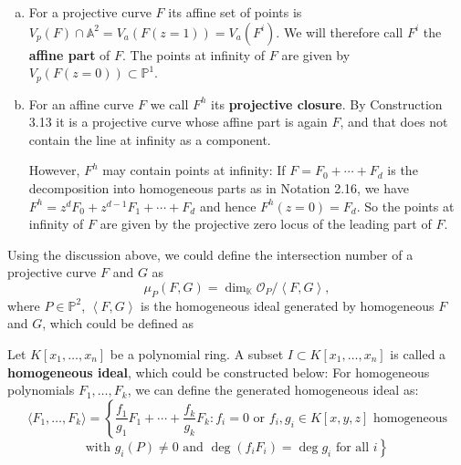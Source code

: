\documentclass[10pt]{article}
\begin{document}
\begin{construction}
  \begin{enumerate}[(a)]
    \item For a projective curve $F$ its affine set of points is $V_p(F) \cap \mathbb{A}^2 = V_a(F(z = 1)) = V_a(F^i)$.
      We will therefore call $F^i$ the \textbf{affine part} of $F$. The points at infinity of $F$ are given by
      $V_p(F(z = 0)) \subset \mathbb{P}^1$.

    \item For an affine curve $F$ we call $F^h$ its \textbf{projective closure}. By Construction 3.13 it is a projective curve whose affine part is again $F$, and that does not contain the line at infinity as a
      component.

      However, $F^h$ may contain points at infinity: If $F = F_0 + \cdots + F_d$ is the decomposition into
      homogeneous parts as in Notation 2.16, we have $F^h = z^d F_0 + z^{d-1} F_1 + \cdots + F_d$ and hence
      $F^h(z = 0) = F_d$. So the points at infinity of $F$ are given by the projective zero locus of the
      leading part of $F$.
  \end{enumerate}
\end{construction}
Using the discussion above, we could define the intersection number of a projective curve $ F$ and $ G$  as
\begin{equation*}
  \mu_{P}(F,G) = \dim_{\mathbb{K}} \mathcal{O}_{P} / \left< F,G \right>,
\end{equation*}
where $ P \in \mathbb{P}^{2}$, $\left< F,G \right>$ is the homogeneous ideal generated by homogeneous $ F$ and $ G$, which could be defined as
\begin{definition}
  Let $K[x_1, \ldots, x_n]$ be a polynomial ring. A subset $I \subset K[x_1, \ldots, x_n]$ is called a \textbf{homogeneous ideal}, which could be constructed below:
  For homogeneous polynomials $F_1, \ldots, F_k$, we can define the generated homogeneous ideal as:
  \begin{equation*}
    \langle F_1, \ldots, F_k \rangle = \left\{ \frac{f_1}{g_1}F_1 + \cdots + \frac{f_k}{g_k}F_k : f_i = 0 \text{ or } f_i, g_i \in K[x, y, z] \text{ homogeneous} \right.
    \end{equation*}
    \begin{equation*}
    \left. \text{with } g_i(P) \neq 0 \text{ and } \deg(f_iF_i) = \deg g_i \text{ for all } i \right\}
  \end{equation*}
\end{definition}
\end{document}
